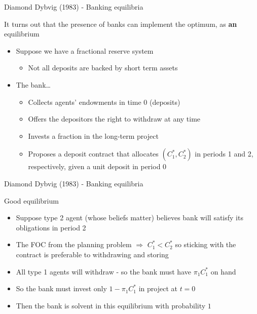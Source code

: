 \begin{frame}{Diamond Dybvig (1983) - Banking equilibria}

It turns out that the presence of banks can implement the optimum, as \textbf{an} equilibrium
\begin{itemize}
\item	Suppose we have a fractional reserve system
	\begin{itemize}
	\item	Not all deposits are backed by short term assets
	\end{itemize}
\item	The bank\ldots
	\begin{itemize}
	\item	Collects agents' endowments in time 0 (deposits)
	\item	Offers the depositors the right to withdraw at any time
	\item	Invests a fraction in the long-term project
	\item	Proposes a deposit contract that allocates $(C_{1}^{\ast},C_{2}^{\ast})$ in periods 1 and 2, respectively, given a unit deposit in period 0
	\end{itemize}
\end{itemize}

\end{frame}



\begin{frame}{Diamond Dybvig (1983) - Banking equilibria}

Good equilibrium
	\begin{itemize}
	\item	Suppose type 2 agent (whose beliefs matter) believes bank will satisfy its obligations in period 2
	\item	The FOC from the planning problem $\Rightarrow$ $C_{1}^{\ast}< C_{2}^{\ast}$ so sticking with the contract is preferable to withdrawing and storing
	\item	All type 1 agents will withdraw - so the bank must have $\pi_{1}C_{1}^{\ast}$ on hand
	\item	So the bank must invest only $1-\pi_{1}C_{1}^{\ast}$ in project at $t=0$
	\item	Then the bank is solvent in this equilibrium with probability $1$
	\end{itemize}

\end{frame}

